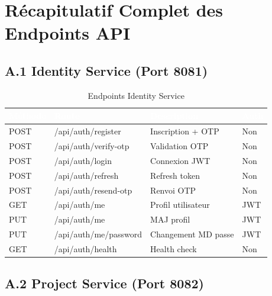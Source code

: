 \appendix
\renewcommand{\chaptername}{Annexe}

\chapter{Récapitulatif Complet des Endpoints API}

\section*{A.1 Identity Service (Port 8081)}

\begin{table}[H]
  \caption{Endpoints Identity Service}
  \centering
  \begin{tabularx}{\textwidth}{|C{1.5cm}|L{5.5cm}|X|C{2cm}|}
    \hline
    \textcolor{white}{\textbf{Méthode}} &
    \textcolor{white}{\textbf{Route}} &
    \textcolor{white}{\textbf{Description}} &
    \textcolor{white}{\textbf{Auth}} \\
    \hline
    POST & /api/auth/register & Inscription + OTP & Non \\
    \hline
    POST & /api/auth/verify-otp & Validation OTP & Non \\
    \hline
    POST & /api/auth/login & Connexion JWT & Non \\
    \hline
    POST & /api/auth/refresh & Refresh token & Non \\
    \hline
    POST & /api/auth/resend-otp & Renvoi OTP & Non \\
    \hline
    GET & /api/auth/me & Profil utilisateur & JWT \\
    \hline
    PUT & /api/auth/me & MAJ profil & JWT \\
    \hline
    PUT & /api/auth/me/password & Changement MD passe & JWT \\
    \hline
    GET & /api/auth/health & Health check & Non \\
    \hline
  \end{tabularx}
\end{table}

\section*{A.2 Project Service (Port 8082)}

